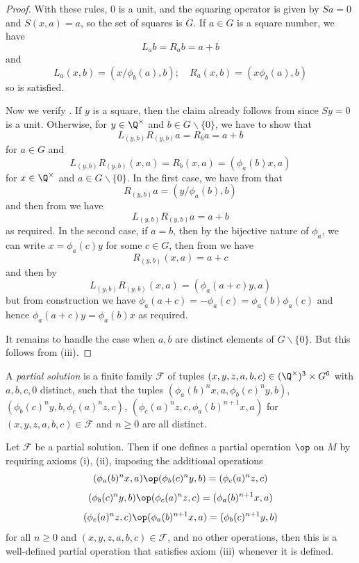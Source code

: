 \begin{proof}
  With these rules, $0$ is a unit, and the squaring operator is given by $Sa = 0$ and $S(x,a) = a$, so the set of squares is $G$.  If $a \in G$ is a square number, we have
  $$ L_a b = R_a b = a+b$$
  and
  $$ L_a (x,b) = (x/\phi_b(a), b); \quad R_a (x,b) = (x \phi_b(a), b)$$
  so  is satisfied.

Now we verify .
If $y$ is a square, then the claim already follows from  since $Sy=0$ is a unit.  Otherwise, for $y \in \Q^\times$ and $b \in G \backslash \{0\}$, we have to show that
$$ L_{(y,b)} R_{(y,b)} a = R_b a = a+b$$
for $a \in G$ and
$$ L_{(y,b)} R_{(y,b)} (x,a) = R_b (x,a) = (\phi_a(b) x, a) $$
for $x \in \Q^\times$ and $a \in G \backslash \{0\}$.  In the first case, we have from  that
$$ R_{(y,b)} a = (y/\phi_a(b), b)$$
and then from  we have
$$L_{(y,b)} R_{(y,b)} a = a+b$$
as required.  In the second case, if $a=b$, then by the bijective nature of $\phi_a$, we can write $x = \phi_a(c) y$ for some $c \in G$, then from  we have
$$ R_{(y,b)} (x,a) = a+c$$
and then by 
$$ L_{(y,b)} R_{(y,b)} (x,a) = (\phi_a(a+c) y, a)$$
but from construction we have $\phi_a(a+c)=-\phi_a(c) = \phi_a(b)\phi_a(c)$ and hence $\phi_a(a+c) y = \phi_a(b) x$ as required.

It remains to handle the case when $a,b$ are distinct elements of $G \backslash \{0\}$.  But this follows from (iii).
\end{proof}

\begin{definition}\label{partial-1323} A \emph{partial solution} is a finite family ${\mathcal F}$ of tuples $(x,y,z,a,b,c) \in (\Q^\times)^3 \times G^6$ with $a,b,c,0$ distinct, such that the tuples
$(\phi_a(b)^n x,a, \phi_b(c)^n y,b)$, $(\phi_b(c)^n y,b,\phi_c(a)^n z,c)$, $(\phi_c(a)^n z,c,\phi_a(b)^{n+1} x, a)$ for $(x,y,z,a,b,c) \in {\mathcal F}$ and $n \geq 0$ are all distinct.
\end{definition}

\begin{lemma}[Soundness]\label{partial-1323-sound}  Let ${\mathcal F}$ be a partial solution.  Then if one defines a partial operation $\op$ on $M$ by requiring axioms (i), (ii), imposing the additional operations
$$ (\phi_a(b)^n x,a) \op (\phi_b(c)^n y,b) = (\phi_c(a)^n z,c)$$
$$ (\phi_b(c)^n y,b) \op (\phi_c(a)^n z,c) = (\phi_a(b)^{n+1} x, a)$$
$$ (\phi_c(a)^n z,c) \op (\phi_a(b)^{n+1} x, a) = (\phi_b(c)^{n+1} y,b)$$
for all $n \geq 0$ and $(x,y,z,a,b,c) \in {\mathcal F}$, and no other operations, then this is a well-defined partial operation that satisfies axiom (iii) whenever it is defined.
\end{lemma}


